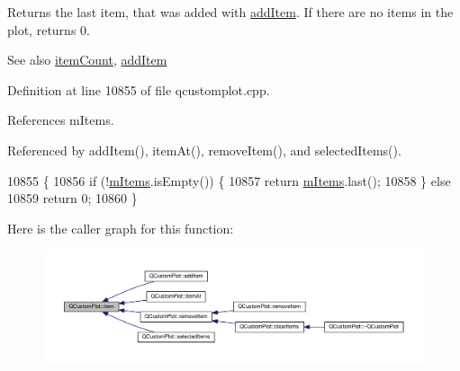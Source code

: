 Returns the last item, that was added with \hyperlink{class_q_custom_plot_aa500620379262321685cb7a7674cbd2a}{add\+Item}. If there are no items in the plot, returns 0.

\begin{DoxySeeAlso}{See also}
\hyperlink{class_q_custom_plot_a6fc860e30df17fd5c46056bf6fe29390}{item\+Count}, \hyperlink{class_q_custom_plot_aa500620379262321685cb7a7674cbd2a}{add\+Item} 
\end{DoxySeeAlso}


Definition at line 10855 of file qcustomplot.\+cpp.



References m\+Items.



Referenced by add\+Item(), item\+At(), remove\+Item(), and selected\+Items().


\begin{DoxyCode}
10855                                          \{
10856   \textcolor{keywordflow}{if} (!\hyperlink{class_q_custom_plot_afa5fd6957169dfef2e4e7815a04c36e0}{mItems}.isEmpty()) \{
10857     \textcolor{keywordflow}{return} \hyperlink{class_q_custom_plot_afa5fd6957169dfef2e4e7815a04c36e0}{mItems}.last();
10858   \} \textcolor{keywordflow}{else}
10859     \textcolor{keywordflow}{return} 0;
10860 \}
\end{DoxyCode}


Here is the caller graph for this function\+:\nopagebreak
\begin{figure}[H]
\begin{center}
\leavevmode
\includegraphics[width=350pt]{class_q_custom_plot_a700399eae539798c5baf64a37c7f2135_icgraph}
\end{center}
\end{figure}


\hypertarget{class_q_custom_plot_a793e4b04e0ede11a733021907368fa83}{}
